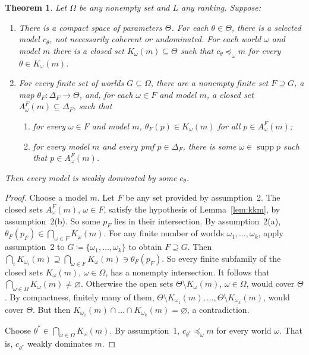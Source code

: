 \documentclass[11pt]{article}
\newtheorem{theorem}{Theorem}[section]
\theoremstyle{definition}
\newcommand{\supp}{\operatorname{supp}}
\begin{document}
\begin{theorem}\label{thm:local}
Let $\Omega$ be any nonempty set and $L$ any ranking. Suppose:
\begin{enumerate}[label=\arabic*.,leftmargin=*]
\item There is a compact space of parameters $\Theta$. For each $\theta\in\Theta$, there is a selected model $c_\theta$, not necessarily coherent or undominated. For each world $\omega$ and model $m$ there is a closed set $K_\omega(m)\subseteq\Theta$ such that $c_\theta\preceq_\omega m$ for every $\theta\in K_\omega(m)$.
\item For every finite set of worlds $G\subseteq\Omega$, there are a nonempty finite set $F\supseteq G$, a map $\theta_F:\Delta_F\to\Theta$, and, for each $\omega\in F$ and model $m$, a closed set $A^F_\omega(m)\subseteq\Delta_F$, such that
\begin{enumerate}[label=(\alph*)]
\item for every $\omega\in F$ and model $m$, $\theta_F(p)\in K_\omega(m)$ for all $p\in A^F_\omega(m)$;
\item for every model $m$ and every pmf $p\in\Delta_F$, there is some $\omega\in\supp p$ such that $p\in A^F_\omega(m)$.
\end{enumerate}
\end{enumerate}
Then every model is weakly dominated by some $c_\theta$.
\end{theorem}
\begin{proof}
Choose a model $m$. Let $F$ be any set provided by assumption~2. The closed sets $A^F_\omega(m)$, $\omega\in F$, satisfy the hypothesis of Lemma~\ref{lem:kkm}, by assumption~2(b). So some $p_F$ lies in their intersection. By assumption~2(a), $\theta_F(p_F)\in\bigcap_{\omega\in F}K_\omega(m)$. For any finite number of worlds $\omega_1,\dots,\omega_k$, apply assumption~2 to $G\coloneqq\{\omega_1,\dots,\omega_k\}$ to obtain $F\supseteq G$. Then $\bigcap_iK_{\omega_i}(m)\supseteq\bigcap_{\omega\in F}K_\omega(m)\ni\theta_F(p_F)$. So every finite subfamily of the closed sets $K_\omega(m)$, $\omega\in\Omega$, has a nonempty intersection. It follows that $\bigcap_{\omega\in\Omega}K_\omega(m)\ne\varnothing$. Otherwise the open sets $\Theta\setminus K_\omega(m)$, $\omega\in\Omega$, would cover $\Theta$. By compactness, finitely many of them, $\Theta\setminus K_{\omega_1}(m),\dots,\Theta\setminus K_{\omega_k}(m)$, would cover $\Theta$. But then $K_{\omega_1}(m)\cap\dots\cap K_{\omega_k}(m)=\varnothing$, a contradiction. 

Choose $\theta^*\in\bigcap_{\omega\in\Omega}K_\omega(m)$. By assumption~1, $c_{\theta^*}\preceq_\omega m$ for every world $\omega$. That is, $c_{\theta^*}$ weakly dominates $m$.
\end{proof}
\end{document}
